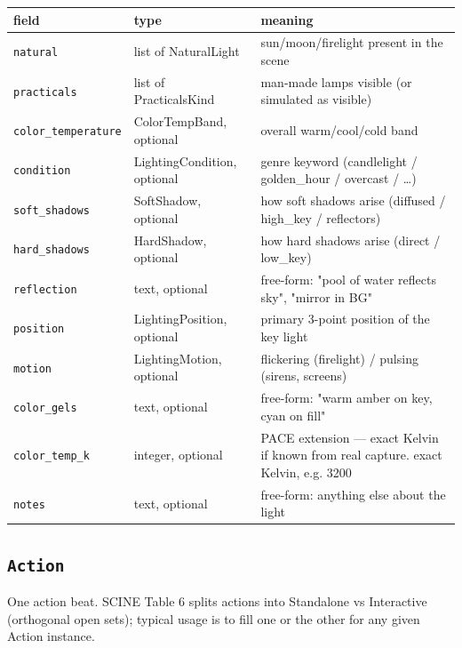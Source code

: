 \begin{longtable}{@{}R{0.24\textwidth}R{0.21\textwidth}R{0.49\textwidth}@{}}
\toprule \textbf{field} & \textbf{type} & \textbf{meaning} \\ \midrule
\endhead
\texttt{natural} & list of NaturalLight & sun/\allowbreak{}moon/\allowbreak{}firelight present in the scene \\
\texttt{practicals} & list of PracticalsKind & man-made lamps visible (or simulated as visible) \\
\texttt{color\_\allowbreak temperature} & ColorTempBand, optional & overall warm/\allowbreak{}cool/\allowbreak{}cold band \\
\texttt{condition} & LightingCondition, optional & genre keyword (candlelight /\allowbreak{} golden\_\allowbreak hour /\allowbreak{} overcast /\allowbreak{} \ldots{}) \\
\texttt{soft\_\allowbreak shadows} & SoftShadow, optional & how soft shadows arise (diffused /\allowbreak{} high\_\allowbreak key /\allowbreak{} reflectors) \\
\texttt{hard\_\allowbreak shadows} & HardShadow, optional & how hard shadows arise (direct /\allowbreak{} low\_\allowbreak key) \\
\texttt{reflection} & text, optional & free-form: "pool of water reflects sky", "mirror in BG" \\
\texttt{position} & LightingPosition, optional & primary 3-point position of the key light \\
\texttt{motion} & LightingMotion, optional & flickering (firelight) /\allowbreak{} pulsing (sirens, screens) \\
\texttt{color\_\allowbreak gels} & text, optional & free-form: "warm amber on key, cyan on fill" \\
\texttt{color\_\allowbreak temp\_\allowbreak k} & integer, optional & PACE extension ---\allowbreak{} exact Kelvin if known from real capture. exact Kelvin, e.g. 3200 \\
\texttt{notes} & text, optional & free-form: anything else about the light \\
\bottomrule
\end{longtable}

\subsection*{\texttt{Action}}
\noindent One action beat. SCINE Table 6 splits actions into Standalone vs Interactive (orthogonal open sets); typical usage is to fill one or the other for any given Action instance.

